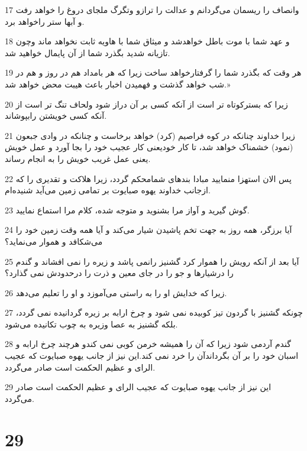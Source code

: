 \par 17 وانصاف را ریسمان می‌گردانم و عدالت را ترازو وتگرگ ملجای دروغ را خواهد رفت و آبها ستر راخواهد برد.
\par 18 و عهد شما با موت باطل خواهدشد و میثاق شما با هاویه ثابت نخواهد ماند وچون تازیانه شدید بگذرد شما از آن پایمال خواهید شد.
\par 19 هر وقت که بگذرد شما را گرفتارخواهد ساخت زیرا که هر بامداد هم در روز و هم در شب خواهد گذشت و فهمیدن اخبار باعث هیبت محض خواهد شد.»
\par 20 زیرا که بسترکوتاه تر است از آنکه کسی بر آن دراز شود ولحاف تنگ تر است از آنکه کسی خویشتن رابپوشاند.
\par 21 زیرا خداوند چنانکه در کوه فراصیم (کرد) خواهد برخاست و چنانکه در وادی جبعون (نمود) خشمناک خواهد شد، تا کار خودیعنی کار عجیب خود را بجا آورد و عمل خویش یعنی عمل غریب خویش را به انجام رساند.
\par 22 پس الان استهزا منمایید مبادا بندهای شمامحکم گردد، زیرا هلاکت و تقدیری را که ازجانب خداوند یهوه صبایوت بر تمامی زمین می‌آید شنیده‌ام.
\par 23 گوش گیرید و آواز مرا بشنوید و متوجه شده، کلام مرا استماع نمایید.
\par 24 آیا برزگر، همه روز به جهت تخم پاشیدن شیار می‌کند و آیا همه وقت زمین خود را می‌شکافد و هموار می‌نماید؟
\par 25 آیا بعد از آنکه رویش را هموار کرد گشنیز رانمی پاشد و زیره را نمی افشاند و گندم را درشیارها و جو را در جای معین و ذرت را درحدودش نمی گذارد؟
\par 26 زیرا که خدایش او را به راستی می‌آموزد و او را تعلیم می‌دهد.
\par 27 چونکه گشنیز با گردون تیز کوبیده نمی شود و چرخ ارابه بر زیره گردانیده نمی گردد، بلکه گشنیز به عصا وزیره به چوب تکانیده می‌شود.
\par 28 گندم آردمی شود زیرا که آن را همیشه خرمن کوبی نمی کندو هرچند چرخ ارابه و اسبان خود را بر آن بگرداندآن را خرد نمی کند.این نیز از جانب یهوه صبایوت که عجیب الرای و عظیم الحکمت است صادر می‌گردد.
\par 29 این نیز از جانب یهوه صبایوت که عجیب الرای و عظیم الحکمت است صادر می‌گردد.
 
\chapter{29}

